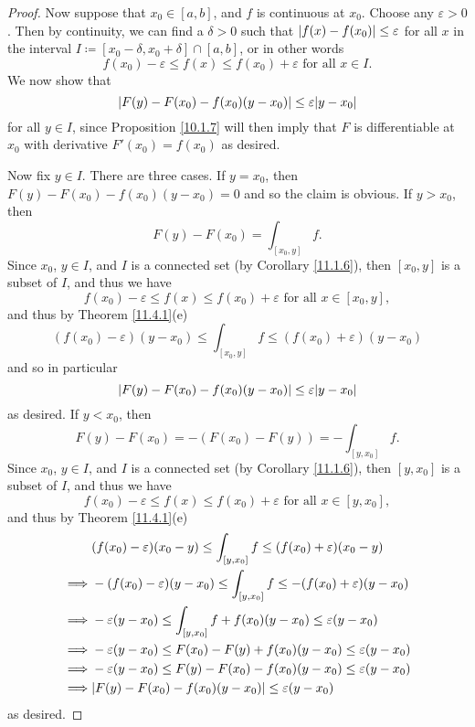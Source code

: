 \begin{proof}
    Now suppose that \(x_0 \in [a, b]\), and \(f\) is continuous at \(x_0\).
    Choose any \(\varepsilon > 0\).
    Then by continuity, we can find a \(\delta > 0\) such that \(\abs*{f(x) - f(x_0)} \leq \varepsilon\) for all \(x\) in the interval \(I \coloneqq [x_0 - \delta, x_0 + \delta] \cap [a, b]\), or in other words
    \[
        f(x_0) - \varepsilon \leq f(x) \leq f(x_0) + \varepsilon \text{ for all } x \in I.
    \]
    We now show that
    \[
        \abs*{F(y) - F(x_0) - f(x_0)(y - x_0)} \leq \varepsilon \abs*{y - x_0}
    \]
    for all \(y \in I\), since Proposition \ref{10.1.7} will then imply that \(F\) is differentiable at \(x_0\) with derivative \(F'(x_0) = f(x_0)\) as desired.

    Now fix \(y \in I\).
    There are three cases.
    If \(y = x_0\), then \(F(y) - F(x_0) - f(x_0)(y - x_0) = 0\) and so the claim is obvious.
    If \(y > x_0\), then
    \[
        F(y) - F(x_0) = \int_{[x_0, y]} f.
    \]
    Since \(x_0\), \(y \in I\), and \(I\) is a connected set (by Corollary \ref{11.1.6}), then \([x_0, y]\) is a subset of \(I\), and thus we have
    \[
        f(x_0) - \varepsilon \leq f(x) \leq f(x_0) + \varepsilon \text{ for all } x \in [x_0, y],
    \]
    and thus by Theorem \ref{11.4.1}(e)
    \[
        (f(x_0) - \varepsilon) (y - x_0) \leq \int_{[x_0, y]} f \leq (f(x_0) + \varepsilon) (y - x_0)
    \]
    and so in particular
    \[
        \abs*{F(y) - F(x_0) - f(x_0)(y - x_0)} \leq \varepsilon \abs*{y - x_0}
    \]
    as desired.
    If \(y < x_0\), then
    \[
        F(y) - F(x_0) = - (F(x_0) - F(y)) = -\int_{[y, x_0]} f.
    \]
    Since \(x_0\), \(y \in I\), and \(I\) is a connected set (by Corollary \ref{11.1.6}), then \([y, x_0]\) is a subset of \(I\), and thus we have
    \[
        f(x_0) - \varepsilon \leq f(x) \leq f(x_0) + \varepsilon \text{ for all } x \in [y, x_0],
    \]
    and thus by Theorem \ref{11.4.1}(e)
    \begin{align*}
                 & (f(x_0) - \varepsilon) (x_0 - y) \leq \int_{[y, x_0]} f \leq (f(x_0) + \varepsilon) (x_0 - y)   \\
        \implies & -(f(x_0) - \varepsilon) (y - x_0) \leq \int_{[y, x_0]} f \leq -(f(x_0) + \varepsilon) (y - x_0) \\
        \implies & -\varepsilon (y - x_0) \leq \int_{[y, x_0]} f + f(x_0)(y - x_0) \leq \varepsilon (y - x_0)      \\
        \implies & -\varepsilon (y - x_0) \leq F(x_0) - F(y) + f(x_0)(y - x_0) \leq \varepsilon (y - x_0)          \\
        \implies & -\varepsilon (y - x_0) \leq F(y) - F(x_0) - f(x_0)(y - x_0) \leq \varepsilon (y - x_0)          \\
        \implies & \abs*{F(y) - F(x_0) - f(x_0)(y - x_0)} \leq \varepsilon (y - x_0)
    \end{align*}
    as desired.
\end{proof}